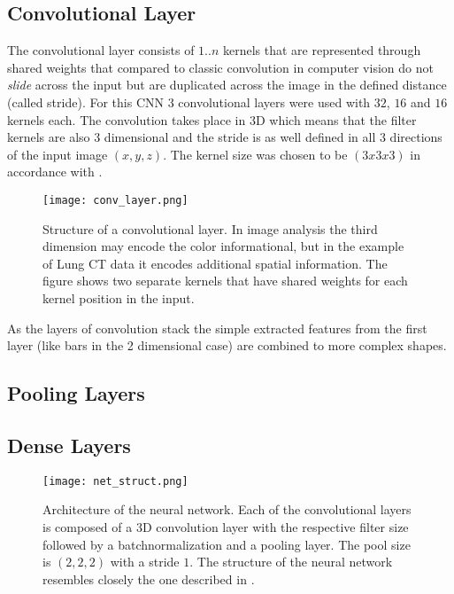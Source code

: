 \documentclass[main.tex]{subfiles}
\begin{document}
\subsection{Convolutional Layer}
The convolutional layer consists of $1..n$ kernels that are represented through shared weights that compared to classic convolution in computer vision do not \emph{slide} across the input but are duplicated across the image in the defined distance (called stride). For this CNN $3$ convolutional layers were used with $32$, $16$ and $16$ kernels each. The convolution takes place in 3D which means that the filter kernels are also 3 dimensional and the stride is as well defined in all 3 directions of the input image $(x,y,z)$. The kernel size was chosen to be $(3x3x3)$ in accordance with \cite{huang2017lung}. 

\begin{figure}
\begin{center}
\texttt{[image: conv\_layer.png]}
\end{center}
\caption{Structure of a convolutional layer. In image analysis the third dimension may encode the color informational, but in the example of Lung CT data it encodes additional spatial information. The figure shows two separate kernels that have shared weights for each kernel position in the input.}
\label{fig:conv_layer}
\end{figure}

As the layers of convolution stack the simple extracted features from the first layer (like bars in the 2 dimensional case) are combined to more complex shapes.


\subsection{Pooling Layers}

\subsection{Dense Layers}

\begin{figure}
\begin{center}
\texttt{[image: net\_struct.png]}
\end{center}
\caption{Architecture of the neural network. Each of the convolutional layers is composed of a 3D convolution layer with the respective filter size followed by a batchnormalization and a pooling layer. The pool size is $(2,2,2)$ with a stride $1$. The structure of the neural network resembles closely the one described in \cite{huang2017lung}.}
\label{fig:net_struct}
\end{figure}
\end{document}
